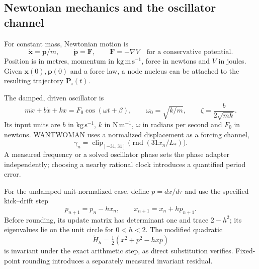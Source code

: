 \documentclass[11pt,a4paper]{article}
\newcommand{\clip}{\operatorname{clip}}
\newcommand{\round}{\operatorname{rnd}}
\numberwithin{equation}{section}
\begin{document}
\subsection{Newtonian mechanics and the oscillator channel}
For constant mass, Newtonian motion is \cite[Ch.~9]{newton}
\begin{equation}
\dot{\bm x}=\bm p/m,\qquad \dot{\bm p}=\bm F,\qquad
\bm F=-\nabla V\quad\text{for a conservative potential}.
\label{eq:newton}
\end{equation}
Position is in metres, momentum in $\mathrm{kg\,m\,s^{-1}}$, force in newtons and $V$ in joules. Given $\bm x(0),\bm p(0)$ and a force law, a node nucleus can be attached to the resulting trajectory $\bm P_i(t)$.

The damped, driven oscillator is \cite[Sec.~23--2]{oscillation}
\begin{equation}
m\ddot x+b\dot x+kx=F_0\cos(\omega t+\beta),\qquad
\omega_0=\sqrt{k/m},\qquad
\zeta=\frac{b}{2\sqrt{mk}}.
\end{equation}
Its input units are $b$ in $\mathrm{kg\,s^{-1}}$, $k$ in $\mathrm{N\,m^{-1}}$, $\omega$ in radians per second and $F_0$ in newtons. WANTWOMAN uses a normalized displacement as a forcing channel,
\begin{equation}
\gamma_n=\clip_{[-31,31]}\bigl(\round(31x_n/L_*)\bigr).
\end{equation}
A measured frequency or a solved oscillator phase sets the phase adapter independently; choosing a nearby rational clock introduces a quantified period error.

For the undamped unit-normalized case, define $p=dx/d\tau$ and use the specified kick--drift step
\begin{equation}
p_{n+1}=p_n-hx_n,\qquad x_{n+1}=x_n+hp_{n+1}.
\label{eq:symplectic}
\end{equation}
Before rounding, its update matrix has determinant one and trace $2-h^2$; its eigenvalues lie on the unit circle for $0<h<2$. The modified quadratic
\begin{equation}
\widetilde H_h=\tfrac12(x^2+p^2-hxp)
\label{eq:modifiedenergy}
\end{equation}
is invariant under the exact arithmetic step, as direct substitution verifies. Fixed-point rounding introduces a separately measured invariant residual.
\end{document}
